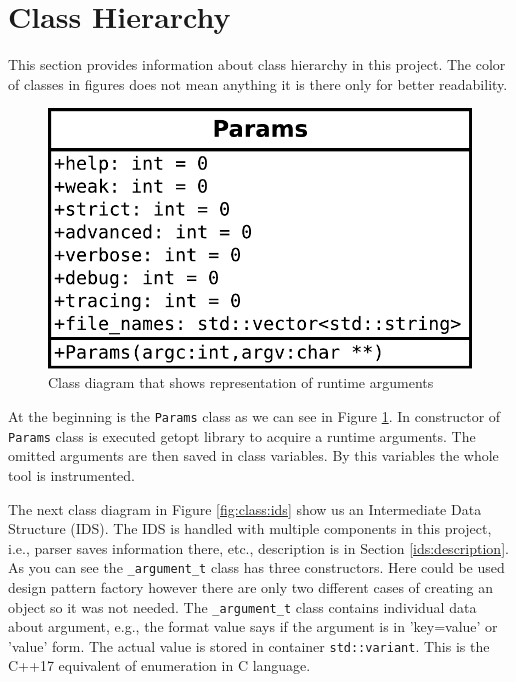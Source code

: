 \section{Class Hierarchy}
This section provides information about class hierarchy in this project. The
color of classes in figures does not mean anything it is there only for better
readability.

\begin{figure}[h]
	\centering
	\includegraphics[width=0.5\linewidth]{obrazky-figures/class/params.pdf}
	\caption{Class diagram that shows representation of runtime arguments}
	\label{fig:class:params}
\end{figure}

At the beginning is the \texttt{Params} class as we can see in Figure
\ref{fig:class:params}. In constructor of \texttt{Params} class is executed
getopt library to acquire a runtime arguments. The omitted arguments are then
saved in class variables. By this variables the whole tool is instrumented.

The next class diagram in Figure \ref{fig:class:ids} show us an Intermediate
Data Structure (IDS). The IDS is handled with multiple components in this
project, i.e., parser saves information there, etc., description is in Section
\ref{ids:description}. As you can see the \texttt{\_argument\_t} class has three
constructors.  Here could be used design pattern factory however there are only
two different cases of creating an object so it was not needed. The
\texttt{\_argument\_t} class contains individual data about argument, e.g., the
format value says if the argument is in 'key=value' or 'value' form. The actual
value is stored in container \texttt{std::variant}. This is the C++17 equivalent
of enumeration in C language.

